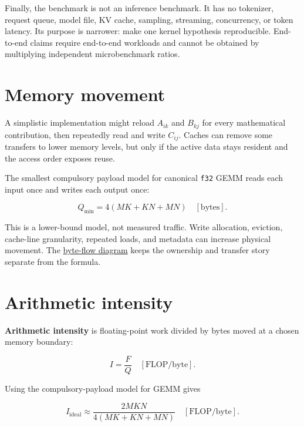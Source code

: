 Finally, the benchmark is not an inference benchmark. It has no
tokenizer, request queue, model file, KV cache, sampling, streaming,
concurrency, or token latency. Its purpose is narrower: make one kernel
hypothesis reproducible. End- to-end claims require end-to-end workloads
and cannot be obtained by multiplying independent microbenchmark ratios.

\section{Memory movement}\label{memory-movement}

A simplistic implementation might reload \(A_{ik}\) and \(B_{kj}\) for
every mathematical contribution, then repeatedly read and write
\(C_{ij}\). Caches can remove some transfers to lower memory levels, but
only if the active data stays resident and the access order exposes
reuse.

The smallest compulsory payload model for canonical \texttt{f32} GEMM
reads each input once and writes each output once:

\begin{equation}
Q_{\min}=4(MK+KN+MN)\quad[\mathrm{bytes}].
\end{equation}

This is a lower-bound model, not measured traffic. Write allocation,
eviction, cache-line granularity, repeated loads, and metadata can
increase physical movement. The
\href{https://github.com/hermonai/inside-the-llm-engine/blob/astra-visual-rewrite/diagrams/linear/follow-the-byte.txt}{byte-flow
diagram} keeps the ownership and transfer story separate from the
formula.

\section{Arithmetic intensity}\label{arithmetic-intensity}

\textbf{Arithmetic intensity} is floating-point work divided by bytes
moved at a chosen memory boundary:

\begin{equation}
I=\frac{F}{Q}\quad[\mathrm{FLOP/byte}].
\end{equation}

Using the compulsory-payload model for GEMM gives

\begin{equation}
I_{\mathrm{ideal}}
\approx\frac{2MKN}{4(MK+KN+MN)}\quad[\mathrm{FLOP/byte}].
\end{equation}

